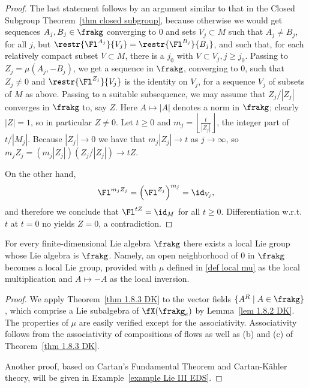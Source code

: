 \begin{proof}
    The last statement follows by an argument similar to that in the Closed Subgroup Theorem~\ref{thm closed subgroup}, because otherwise we would get sequences $A_j,B_j\in\frakg$ converging to $0$ and sets $V_j\subset M$ such that $A_j\neq B_j$, for all $j$, but $\restr{\Fl^{A_j}}{V_j}=\restr{\Fl^{B_j}}{B_j}$, and such that, for each relatively compact subset $V\subset M$, there is a $j_0$ with $V\subset V_j,j\geq j_0$. Passing to $Z_j=\mu(A_j,-B_j)$, we get a sequence in $\frakg$, converging to $0$, such that $Z_j\neq 0$ and $\restr{\Fl^{Z_j}}{V_j}$ is the identity on $V_j$, for a sequence $V_j$ of subsets of $M$ as above. Passing to a suitable subsequence, we may assume that $Z_j/|Z_j|$ converges in $\frakg$ to, say $Z$. Here $A\mapsto |A|$ denotes a norm in $\frakg$; clearly $|Z|=1$, so in particular $Z\neq 0$. Let $t\geq 0$ and $m_j=\left\lfloor\frac{t}{|Z_j|}\right\rfloor$, the integer part of $t/|M_j|$. Because $|Z_j|\to 0$ we have that $m_j|Z_j|\to t$ as $j\to \infty$, so $m_j Z_j=(m_j|Z_j|)(Z_j/|Z_j|)\to tZ$.

    On the other hand,
    \[\Fl^{m_jZ_j}=\left(\Fl^{Z_j}\right)^{m_j}=\id_{V_j},\]
    and therefore we conclude that $\Fl^{tZ}=\id_{M}$ for all $t\geq 0$. Differentiation w.r.t.\ $t$ at $t=0$ no yields $Z=0$, a contradiction.
\end{proof}


\begin{thm}\label{thm local Lie's third}
    For every finite-dimensional Lie algebra $\frakg$ there exists a local Lie group whose Lie algebra is $\frakg$. Namely, an open neighborhood of $0$ in $\frakg$ becomes a local Lie group, provided with $\mu$ defined in \eqref{def local mu} as the local multiplication and $A\mapsto -A$ as the local inversion.
\end{thm}
\begin{proof}
    We apply Theorem~\ref{thm 1.8.3 DK} to the vector fields $\{A^R\mid A\in\frakg\}$, which comprise a Lie subalgebra of $\fX(\frakg_e)$ by Lemma~\ref{lem 1.8.2 DK}. The properties of $\mu$ are easily verified except for the associativity. Associativity follows from the associativity of compositions of flows as well as (b) and (c) of Theorem~\ref{thm 1.8.3 DK}.

    Another proof, based on Cartan's Fundamental Theorem and Cartan-K\"ahler theory, will be given in Example~\ref{example Lie III EDS}. 
\end{proof}

